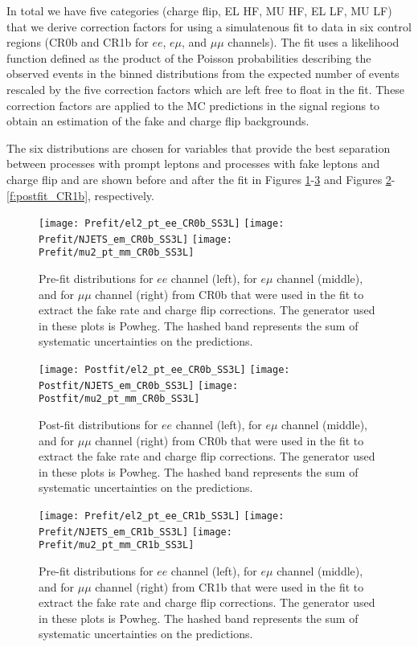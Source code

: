In total we have five categories (charge flip, EL HF, MU HF, EL LF, MU LF) that we derive correction factors for using a simulatenous fit to data in six control regions (CR0b and CR1b for $ee$, $e\mu$, and $\mu\mu$ channels).
The fit uses a likelihood function defined as the product of the Poisson probabilities describing the observed events in the binned 
distributions from the expected number 
of events rescaled by the five correction factors which are left free to float in the fit.  
These correction factors are applied to the MC predictions in the signal regions to obtain an estimation of the fake and charge flip backgrounds. 

The six distributions are chosen for variables that provide the best separation between processes with prompt leptons and processes with fake leptons and charge flip and are shown 
before and after the fit in Figures \ref{f:prefit_CR0b}-\ref{f:prefit_CR1b} and Figures \ref{f:postfit_CR0b}-\ref{f:postfit_CR1b}, respectively. 

 \begin{figure}[htb]
   \texttt{[image: Prefit/el2\_pt\_ee\_CR0b\_SS3L]}
   \texttt{[image: Prefit/NJETS\_em\_CR0b\_SS3L]}
   \texttt{[image: Prefit/mu2\_pt\_mm\_CR0b\_SS3L]}
 \caption{
 Pre-fit distributions for  $ee$ channel (left),  for  $e\mu$ channel (middle), and  for  $\mu\mu$ channel (right) from CR0b that were used in the fit to extract the fake rate and charge flip corrections.
The generator used in these plots is Powheg. The hashed band represents the sum of systematic uncertainties on the predictions.
 \label{f:prefit_CR0b}
 }
 \end{figure}

\begin{figure}[htb]
  \texttt{[image: Postfit/el2\_pt\_ee\_CR0b\_SS3L]}
  \texttt{[image: Postfit/NJETS\_em\_CR0b\_SS3L]}
  \texttt{[image: Postfit/mu2\_pt\_mm\_CR0b\_SS3L]}
\caption{
Post-fit distributions for  $ee$ channel (left),  for  $e\mu$ channel (middle), and  for  $\mu\mu$ channel (right) from CR0b that were used in the fit to extract the fake rate and charge flip corrections.
The generator used in these plots is Powheg. The hashed band represents the sum of systematic uncertainties on the predictions.
\label{f:postfit_CR0b}
}
\end{figure}

 \begin{figure}[htb]
   \texttt{[image: Prefit/el2\_pt\_ee\_CR1b\_SS3L]}
   \texttt{[image: Prefit/NJETS\_em\_CR1b\_SS3L]}
   \texttt{[image: Prefit/mu2\_pt\_mm\_CR1b\_SS3L]}
 \caption{
 Pre-fit distributions for  $ee$ channel (left), for  $e\mu$ channel (middle), and  for  $\mu\mu$ channel (right) from CR1b that were used in the fit to extract the fake rate and charge flip corrections.
The generator used in these plots is Powheg. The hashed band represents the sum of systematic uncertainties on the predictions.
 \label{f:prefit_CR1b}
 }
 \end{figure}

